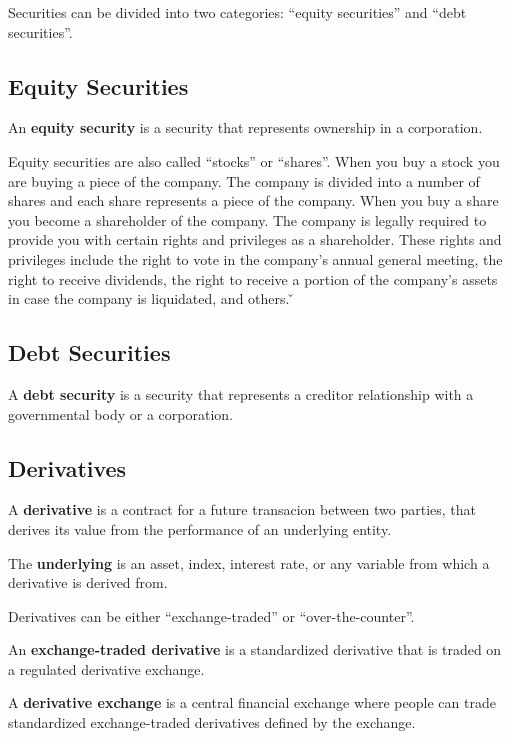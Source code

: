 Securities can be divided into two categories: ``equity securities'' and ``debt securities''.

\subsection{Equity Securities}

An \textbf{equity security} is a security that represents ownership in a corporation.
\ed

Equity securities are also called ``stocks'' or ``shares''. When you buy a stock you are buying a piece of the company.
The company is divided into a number of shares and each share represents a piece of the company. When you buy a share you
become a shareholder of the company. The company is legally required to provide you with certain rights and privileges
as a shareholder. These rights and privileges include the right to vote in the company's annual general meeting, the
right to receive dividends, the right to receive a portion of the company's assets in case the company is liquidated, and
others. \v

\subsection{Debt Securities}

A \textbf{debt security} is a security that represents a creditor relationship with a governmental body or a
corporation.
\ed

\subsection{Derivatives}

\bd[Derivative]
A \textbf{derivative} is a contract for a future transacion between two parties, that derives its value from the
performance of an underlying entity.
\ed

\bd[Underlying]
The \textbf{underlying} is an asset, index, interest rate, or any variable from which a derivative is derived from.
\ed

Derivatives can be either ``exchange-traded'' or ``over-the-counter''.

An \textbf{exchange-traded derivative} is a standardized derivative that is traded on a regulated derivative exchange.
\ed

A \textbf{derivative exchange} is a central financial exchange where people can trade standardized exchange-traded
derivatives defined by the exchange.
\ed

